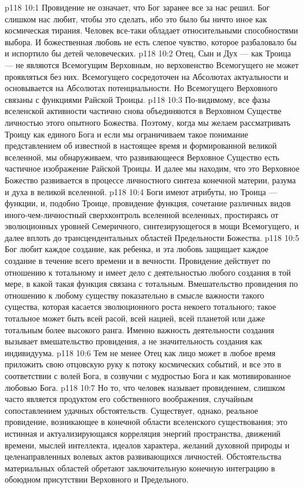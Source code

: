 \vs p118 10:1 Провидение не означает, что Бог заранее все за нас решил. Бог слишком нас любит, чтобы это сделать, ибо это было бы ничто иное как космическая тирания. Человек все\hyp{}таки обладает относительными способностями выбора. И божественная любовь не есть слепое чувство, которое разбаловало бы и испортило бы детей человеческих.
\vs p118 10:2 \pc Отец, Сын и Дух --- как Троица --- не являются Всемогущим Верховным, но верховенство Всемогущего не может проявляться без них.  Всемогущего сосредоточен на Абсолютах актуальности и основывается на Абсолютах потенциальности. Но  Всемогущего Верховного связаны с функциями Райской Троицы.
\vs p118 10:3 По\hyp{}видимому, все фазы вселенской активности частично снова объединяются в Верховном Существе личностью этого опытного Божества. Поэтому, когда мы желаем рассматривать Троицу как единого Бога и если мы ограничиваем такое понимание представлением об известной в настоящее время и формированной великой вселенной, мы обнаруживаем, что развивающееся Верховное Существо есть частичное изображение Райской Троицы. И далее мы находим, что это Верховное Божество развивается в процессе личностного синтеза конечной материи, разума и духа в великой вселенной.
\vs p118 10:4 Боги имеют атрибуты, но Троица --- функции, и, подобно Троице, провидение  функция, сочетание различных видов иного\hyp{}чем\hyp{}личностный сверхконтроль вселенной вселенных, простираясь от эволюционных уровней Семеричного, синтезирующегося в мощи Всемогущего, и далее вплоть до трансцендентальных областей Предельности Божества.
\vs p118 10:5 \pc Бог любит каждое создание, как ребенка, и эта любовь защищает каждое создание в течение всего времени и в вечности. Провидение действует по отношению к тотальному и имеет дело с деятельностью любого создания в той мере, в какой такая функция связана с тотальным. Вмешательство провидения по отношению к любому существу показательно в смысле важности  такого существа, которая касается эволюционного роста некоего тотального; такое тотальное может быть всей расой, всей нацией, всей планетой или даже тотальным более высокого ранга. Именно важность деятельности создания вызывает вмешательство провидения, а не значительность создания как индивидуума.
\vs p118 10:6 Тем не менее Отец как лицо может в любое время приложить свою отцовскую руку к потоку космических событий, и все это в соответствии с волей Бога, в созвучии с мудростью Бога и как мотивированное любовью Бога.
\vs p118 10:7 Но то, что человек называет провидением, слишком часто является продуктом его собственного воображения, случайным сопоставлением удачных обстоятельств. Существует, однако, реальное провидение, возникающее в конечной области вселенского существования; это истинная и актуализирующаяся корреляция энергий пространства, движений времени, мыслей интеллекта, идеалов характера, желаний духовной природы и целенаправленных волевых актов развивающихся личностей. Обстоятельства материальных областей обретают заключительную конечную интеграцию в обоюдном присутствии Верховного и Предельного.
